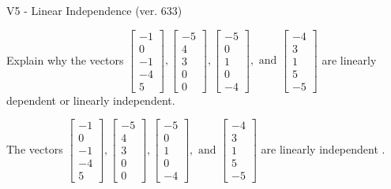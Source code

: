 \begin{exercise}
  \begin{exerciseTitle}V5 - Linear Independence (ver. 633)\end{exerciseTitle}
  \begin{exerciseStatement}
    Explain why the vectors \(\left[\begin{array}{r}
-1 \\
0 \\
-1 \\
-4 \\
5
\end{array}\right] , \left[\begin{array}{r}
-5 \\
4 \\
3 \\
0 \\
0
\end{array}\right] , \left[\begin{array}{r}
-5 \\
0 \\
1 \\
0 \\
-4
\end{array}\right] , \text{ and } \left[\begin{array}{r}
-4 \\
3 \\
1 \\
5 \\
-5
\end{array}\right]\) are linearly dependent or linearly independent.	


  \end{exerciseStatement}
  \begin{exerciseAnswer}
   The vectors \(\left[\begin{array}{r}
-1 \\
0 \\
-1 \\
-4 \\
5
\end{array}\right] , \left[\begin{array}{r}
-5 \\
4 \\
3 \\
0 \\
0
\end{array}\right] , \left[\begin{array}{r}
-5 \\
0 \\
1 \\
0 \\
-4
\end{array}\right] , \text{ and } \left[\begin{array}{r}
-4 \\
3 \\
1 \\
5 \\
-5
\end{array}\right]\) are 
  	 linearly independent  .
  


  \end{exerciseAnswer}
\end{exercise}